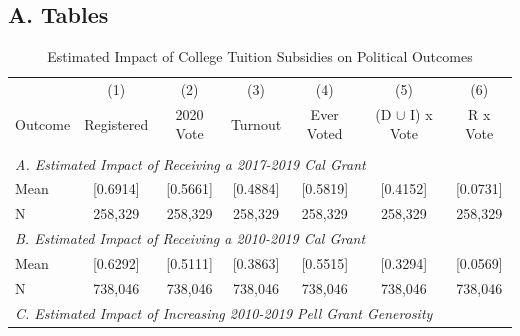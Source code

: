 \documentclass[12pt,letterpaper,oneside]{book}
\newcommand{\basepath}{g:/My Drive/Grad School}
\newcommand{\basepath}{basepath}
\begin{document}
\setcounter{table}{0}
\renewcommand{\thetable}{C\arabic{table}}
\setcounter{figure}{0}
\renewcommand{\thefigure}{C\arabic{figure}}

\subsection*{A. Tables}\label{sec:tab}



\begin{table}[h!]\centering
        \def\sym#1{\ifmmode^{#1}\else\(^{#1}\)\fi}
        \caption{Estimated Impact of College Tuition Subsidies on Political Outcomes\label{tab:mainresults}}
        \begin{tabular}{l*{6}{c}}
            \hline\hline
            &\multicolumn{1}{c}{(1)}&\multicolumn{1}{c}{(2)}&\multicolumn{1}{c}{(3)}&\multicolumn{1}{c}{(4)}&\multicolumn{1}{c}{(5)}&\multicolumn{1}{c}{(6)}\\
            Outcome&\multicolumn{1}{c}{Registered}&\multicolumn{1}{c}{2020 Vote}&\multicolumn{1}{c}{Turnout}&\multicolumn{1}{c}{Ever Voted}&\multicolumn{1}{c}{ (D $\cup$ I) x Vote}&\multicolumn{1}{c}{R x Vote}\\
            \hline
            &&&&&&\\
            \multicolumn{7}{l}{\textit{A. Estimated Impact of Receiving a 2017-2019 Cal Grant}} \\ [0.5em]
            
            Mean&[0.6914]&[0.5661]&[0.4884]&[0.5819]&[0.4152]&[0.0731]\\
            N      &   258,329     &    258,329      &      258,329      &   258,329    &   258,329      &   258,329      \\ [0.5em]

            \multicolumn{7}{l}{\textit{B. Estimated Impact of Receiving a 2010-2019 Cal Grant}} \\ [0.5em]

            
            Mean&[0.6292]&[0.5111]&[0.3863]&[0.5515]&[0.3294]&[0.0569]\\
            N& 738,046     &    738,046      &      738,046      &   738,046 &738,046      &   738,046\\ [0.5em]


            \multicolumn{7}{l}{\textit{C. Estimated Impact of Increasing 2010-2019 Pell Grant Generosity}} \\ [0.5em]


\end{tabular}
\end{table}
\end{document}
